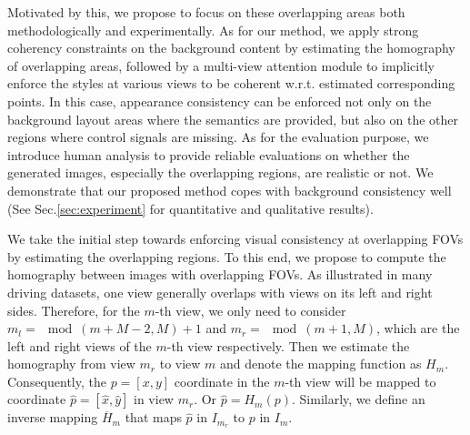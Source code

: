 Motivated by this, we propose to focus on these overlapping areas both methodologically and experimentally. As for our method, we apply strong coherency constraints on the background content by estimating the homography of overlapping areas, followed by a multi-view attention module to implicitly enforce the styles at various views to be coherent w.r.t. estimated corresponding points. 
In this case, appearance consistency can be enforced not only on the background layout areas where the semantics are provided, but also on the other regions where control signals are missing. 
As for the evaluation purpose, we introduce human analysis to provide reliable evaluations on whether the generated images, especially the overlapping regions, are realistic or not. We demonstrate that our proposed method copes with background consistency well (See Sec.\ref{sec:experiment} for quantitative and qualitative results).

 We take the initial step towards enforcing visual consistency at overlapping FOVs by estimating the overlapping regions. To this end, we propose to compute the homography between images with overlapping FOVs. As illustrated in many driving datasets, one view generally overlaps with views on its left and right sides. Therefore, for the $m$-th view, we only need to consider $m_l=\mod(m+M-2,M)+1$ and $m_r=\mod(m+1,M)$, which are the left and right views of the $m$-th view respectively. Then we estimate the homography from view $m_r$ to view $m$ and denote the mapping function as $H_m$. Consequently, the $p=[x,y]$ coordinate in the $m$-th view will be mapped to coordinate $\hat{p}=[\hat{x},\hat{y}]$ in view $m_r$. Or $\hat{p}=H_m(p)$. Similarly, we define an inverse mapping $\overline{H}_m$ that maps $\hat{p}$ in $I_{m_r}$ to $p$ in $I_{m}$. 



